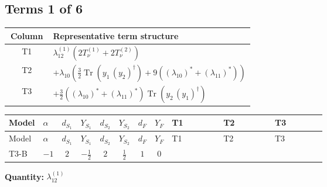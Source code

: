 \documentclass[8pt]{article}
\begin{document}
\begin{landscape}
\subsection*{Terms 1 of 6}
\begin{center}
\begin{tabular}{@{}c >{\raggedright\arraybackslash}p{0.82\linewidth}@{}}
\toprule
Column & Representative term structure \\
\midrule
T1 & \(\displaystyle {\lambda_{12}^{(1)}} (2 T_{\nu}^{(1)}+2 T_{\nu}^{(2)})\) \\
\midrule
T2 & \(\displaystyle +{\lambda_{10}} \left(\frac{3}{2} \operatorname{Tr}\!\left({y_1}\,\left({y_2}\right)^{\dagger}\right)+9 (\left({\lambda_{10}}\right)^{*}+\left({\lambda_{11}}\right)^{*})\right)\) \\
\midrule
T3 & \(\displaystyle +\frac{3}{2} (\left({\lambda_{10}}\right)^{*}+\left({\lambda_{11}}\right)^{*}) \operatorname{Tr}\!\left({y_2}\,\left({y_1}\right)^{\dagger}\right)\) \\
\midrule
\bottomrule
\end{tabular}
\end{center}
\smallskip
\tiny
\begin{longtable}{@{}llcccccc >{\raggedright\arraybackslash}p{0.21\linewidth} >{\raggedright\arraybackslash}p{0.21\linewidth} >{\raggedright\arraybackslash}p{0.21\linewidth}@{}}
\toprule
Model & $\alpha$ & $d_{S_1}$ & $Y_{S_1}$ & $d_{S_2}$ & $Y_{S_2}$ & $d_F$ & $Y_F$ & T1 & T2 & T3 \\
\midrule
\endfirsthead
\toprule
Model & $\alpha$ & $d_{S_1}$ & $Y_{S_1}$ & $d_{S_2}$ & $Y_{S_2}$ & $d_F$ & $Y_F$ & T1 & T2 & T3 \\
\midrule
\endhead
T3-B & $-1$ & $2$ & $-\frac{1}{2}$ & $2$ & $\frac{1}{2}$ & $1$ & $0$ & \scriptsize\adjustbox{max width=\linewidth}{$\begin{gathered} {\lambda_{12}^{(1)}} (2 T_{\nu}^{(1)}+2 T_{\nu}^{(2)})\end{gathered}$} & \scriptsize\adjustbox{max width=\linewidth}{$\begin{gathered} +{\lambda_{10}} \left(\frac{3}{2} \operatorname{Tr}\!\left({y_1}\,\left({y_2}\right)^{\dagger}\right)+9 (\left({\lambda_{10}}\right)^{*}+\left({\lambda_{11}}\right)^{*})\right) \\ +{\lambda_{11}} \left(\frac{3}{2} \operatorname{Tr}\!\left({y_1}\,\left({y_2}\right)^{\dagger}\right)+9 (\left({\lambda_{10}}\right)^{*}+\left({\lambda_{11}}\right)^{*})\right)\end{gathered}$} & \scriptsize\adjustbox{max width=\linewidth}{$\begin{gathered} +\frac{3}{2} (\left({\lambda_{10}}\right)^{*}+\left({\lambda_{11}}\right)^{*}) \operatorname{Tr}\!\left({y_2}\,\left({y_1}\right)^{\dagger}\right)\end{gathered}$} \\
\midrule
\bottomrule
\end{longtable}
\clearpage
\noindent\textbf{Quantity: }$\lambda_{12}^{(1)}$\par\smallskip

\end{landscape}
\end{document}
